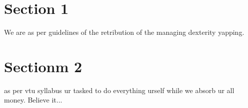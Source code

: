 \documentclass{article}
\begin{document}
	\section{Section 1}
	      We are as per guidelines of the retribution of the managing dexterity yapping.
	 \section{Sectionm 2}
	 as per vtu syllabus ur tasked to do everything urself while we absorb ur all money. Believe it...
\end{document}
